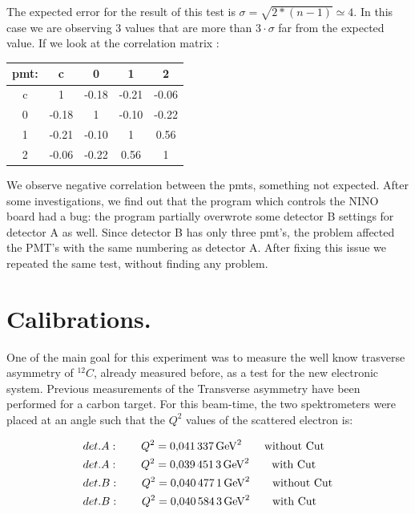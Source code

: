 The expected error for the result of this test is $\sigma = \sqrt{2*(n-1)} \simeq 4$. In this case we are observing 3 values that are more than  $3 \cdot \sigma$ far from the expected value. If we look at the correlation matrix :

\begin{center}
\begin{tabular}{|c|c|c|c|c|}
\hline 
pmt: & c & 0 & 1 & 2 \\ 
\hline 
c 	 & 1 & -0.18  & -0.21  & -0.06  \\ 
\hline 
0 	 & -0.18  & 1 & -0.10  & -0.22  \\ 
\hline 
1    & -0.21  & -0.10  & 1 & 0.56  \\ 
\hline 
2    & -0.06 & -0.22  & 0.56  & 1 \\ 
\hline 
\end{tabular} 
\end{center}


We observe negative correlation between the pmts, something not expected. After some investigations, we find out that the program which controls the NINO board had a bug: the program partially overwrote some detector B settings for detector A as well. Since detector B has only three pmt's, the problem affected the PMT's with the same numbering as detector A. After fixing this issue we repeated the same test, without finding any problem. 

\section{Calibrations.}

One of the main goal for this experiment was to measure the well know trasverse asymmetry of $^{12}C$, already measured before, as a test for the new electronic system. Previous measurements of the Transverse asymmetry have been performed for a carbon target. For this beam-time, the two spektrometers were placed at an angle such that the $Q^{2}$ values of the scattered electron is:

\begin{flushleft}
\begin{align*}
& det. A : \qquad Q^{2} = \SI{0.041337}{\giga \electronvolt \squared} \qquad \textnormal{without Cut} \\
& det. A : \qquad Q^{2} = \SI{0.0394513}{\giga \electronvolt \squared} \qquad \textnormal{with Cut} \\
& det. B : \qquad Q^{2} = \SI{0.0404771}{\giga \electronvolt \squared} \qquad \textnormal{without Cut} \\
& det. B : \qquad Q^{2} = \SI{0.0405843}{\giga \electronvolt \squared} \qquad \textnormal{with Cut} 
\end{align*} 
\end{flushleft}

